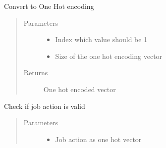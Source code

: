 \documentclass[letterpaper,10pt,english]{sphinxmanual}
\begin{document}
\begin{fulllineitems}
\begin{fulllineitems}
\label{\detokenize{environments:environments.env_tetris_scheduling.Env.to_one_hot}}
\sphinxAtStartPar
Convert to One Hot encoding
\begin{quote}\begin{description}
\item[{Parameters}] \leavevmode\begin{itemize}
\item {} 
\sphinxAtStartPar
{} \textendash{} Index which value should be 1

\item {} 
\sphinxAtStartPar
{} \textendash{} Size of the one hot encoding vector

\end{itemize}

\item[{Returns}] \leavevmode
\sphinxAtStartPar
One hot encoded vector

\end{description}\end{quote}

\end{fulllineitems}


\begin{fulllineitems}
\label{\detokenize{environments:environments.env_tetris_scheduling.Env.check_valid_job_action}}
\sphinxAtStartPar
Check if job action is valid
\begin{quote}\begin{description}
\item[{Parameters}] \leavevmode\begin{itemize}
\item {} 
\sphinxAtStartPar
{} \textendash{} Job action as one hot vector


\end{itemize}
\end{description}
\end{quote}
\end{fulllineitems}
\end{fulllineitems}
\end{document}
